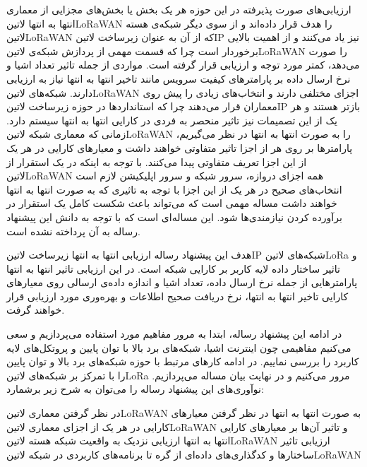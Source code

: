 ارزیابی‌های صورت پذیرفته در این حوزه هر یک بخش یا بخش‌های مجزایی از معماری انتها به انتها ‌لاتین{LoRaWAN} را هدف قرار داده‌اند و از سوی دیگر شبکه‌ی هسته ‌لاتین{LoRaWAN}
که از آن به عنوان زیرساخت ‌لاتین{IP} نیز یاد می‌کنند
و از اهمیت بالایی برخوردار است چرا که قسمت مهمی از پردازش شبکه‌ی ‌لاتین{LoRaWAN} را صورت می‌دهد، کمتر مورد توجه و ارزیابی قرار گرفته است.
مواردی از جمله تاثیر تعداد اشیا و نرخ ارسال داده بر پارامترهای کیفیت سرویس مانند تاخیر انتها به انتها نیاز به ارزیابی دارند.
شبکه‌های ‌لاتین{LoRaWAN} اجزای مختلفی دارند و انتخاب‌های زیادی را پیش روی معماران قرار می‌دهند
چرا که استانداردها در حوزه زیرساخت ‌لاتین{IP} بازتر هستند و
هر یک از این تصمیمات نیز
تاثیر منحصر به فردی در کارایی انتها به انتها سیستم دارد.
زمانی که معماری شبکه ‌لاتین{LoRaWAN} را به صورت انتها به انتها در نظر می‌گیریم، پارامترها بر روی هر از اجزا تاثیر متفاوتی خواهند داشت
و معیارهای کارایی در هر یک از این اجزا تعریف متفاوتی پیدا می‌کنند. با توجه به اینکه در یک استقرار از ‌لاتین{LoRaWAN} همه اجزای دروازه، سرور شبکه و سرور اپلیکیشن لازم است
انتخاب‌های صحیح در هر یک از این اجزا با توجه به تاثیری که به صورت انتها به انتها خواهند داشت مساله مهمی است که می‌تواند باعث شکست کامل یک استقرار در برآورده کردن نیازمندی‌ها شود.
این مساله‌ای است که با توجه به دانش این پیشنهاد رساله به آن پرداخته نشده است.

هدف این پیشنهاد رساله ارزیابی انتها به انتها زیرساخت ‌لاتین{IP} شبکه‌های ‌لاتین{LoRa}
و تاثیر ساختار داده لایه کاربر بر کارایی شبکه
است.
در این ارزیابی تاثیر انتها به انتها پارامترهایی از جمله نرخ ارسال داده، تعداد اشیا و اندازه داده‌ی ارسالی روی معیارهای کارایی تاخیر انتها به انتها،
نرخ دریافت صحیح اطلاعات و بهره‌وری مورد ارزیابی قرار خواهند گرفت.

در ادامه این پیشنهاد رساله، ابتدا به مرور مفاهیم مورد استفاده می‌پردازیم و سعی می‌کنیم مفاهیمی چون اینترنت اشیا، شبکه‌های برد بالا با توان پایین و
پروتکل‌های لایه کاربرد را بررسی نماییم. در ادامه
کارهای مرتبط با حوزه شبکه‌های برد بالا و توان پایین را با تمرکز بر شبکه‌های ‌لاتین{LoRa} مرور می‌کنیم و در نهایت بیان مساله می‌پردازیم.
نوآوری‌های این پیشنهاد رساله را می‌توان به شرح زیر برشمارد:

 در نظر گرفتن معماری ‌لاتین{LoRaWAN} به صورت انتها به انتها
 در نظر گرفتن معیارهای کارایی در هر یک از اجزای معماری ‌لاتین{LoRaWAN} و تاثیر آن‌ها بر معیارهای کارایی انتها به انتها
 ارزیابی نزدیک به واقعیت شبکه هسته ‌لاتین{LoRaWAN}
 ارزیابی تاثیر ساختارها و کدگذاری‌های داده‌ای از گره تا برنامه‌های کاربردی در شبکه ‌لاتین{LoRaWAN}
